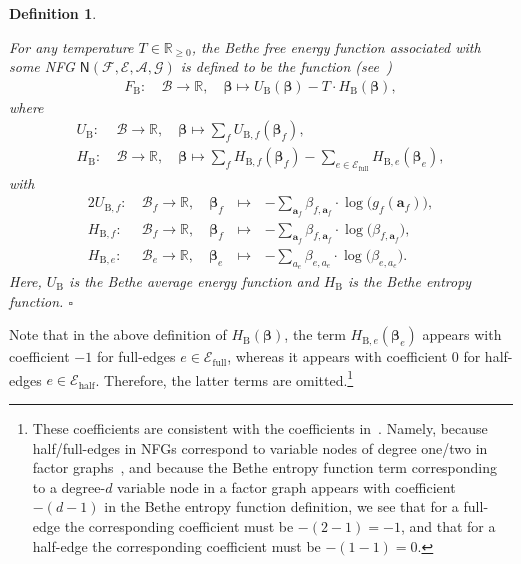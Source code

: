 \documentclass[journal, twocolumn]{IEEEtran}
\renewcommand{\mathbf}[1]{{\bm{#1}}}
\renewcommand{\geq}{\geqslant}
\newcommand{\R}{\mathbb{R}}
\newcommand{\Rp}{\mathbb{R}_{\geq 0}}
\newcommand{\vect}[1]{\mathbf{#1}}
\newcommand{\set}[1]{\mathcal{#1}}
\newcommand{\graph}[1]{\mathsf{#1}}
\newcommand{\bel}{\beta}
\newcommand{\vbel}{\boldsymbol{\bel}}
\newcommand{\setA}{\set{A}}
\newcommand{\setE}{\set{E}}
\newcommand{\setEfull}{\set{E}_{\mathrm{full}}}
\newcommand{\setEhalf}{\set{E}_{\mathrm{half}}}
\newcommand{\setF}{\set{F}}
\newcommand{\setG}{\set{G}}
\newcommand{\va}{\vect{a}}
\newcommand{\lmpB}{\mathcal{B}}
\newcommand{\graphN}{\graph{N}}
\newcommand{\FBethe}{F_{\mathrm{B}}}
\newcommand{\UBethe}{U_{\mathrm{B}}}
\newcommand{\HBethe}{H_{\mathrm{B}}}
\newcommand{\UBethesub}[1]{U_{\mathrm{B},#1}}
\newcommand{\HBethesub}[1]{H_{\mathrm{B},#1}}
\newcommand{\?}{\mathrm{?}}
\newcommand{\qedwhite}{\hspace*{\fill}%
  $\square$\smallskip}
\newcommand{\defend}{\qedwhite}
\newtheorem{Definition}[Lemma]{Definition}
\begin{document}
\begin{Definition}
  \label{def:Bethe:free:energy:1}

  For any temperature $T \in \Rp$, the Bethe free energy function associated
  with some NFG $\graphN(\setF,\setE, \setA, \setG)$ is
  defined to be the function (see~\cite{Yedidia:Freeman:Weiss:05:1})
  \begin{align*}
    \FBethe: \ 
      &\lmpB
         \to \R, \quad
       \vbel
       \mapsto
         \UBethe(\vbel)
         -
         T
         \cdot \HBethe(\vbel),
  \end{align*}
  where
  \begin{align*}
    \UBethe: \ 
      &\lmpB
         \to \R, 
       \quad
       \vbel
       \mapsto
         \sum_f
           \UBethesub{f}(\vbel_f), \\
    \HBethe: \ 
      &\lmpB
         \to \R,
       \quad
       \vbel
       \mapsto
         \sum_f
           \HBethesub{f}(\vbel_f)
         -
         \sum_{e \in \setEfull}
           \HBethesub{e}(\vbel_e),
  \end{align*}
  with
  \begin{alignat*}{2}
    \UBethesub{f}: \ 
      &\lmpB_f
         \to \R, \quad
       \vbel_f
       &
       \, \mapsto\,
       &
         -
         \sum_{\va_f}
           \bel_{f,\va_f}
           \cdot
           \log
             \big(
               g_f(\va_f)
             \big), \\
    \HBethesub{f}: \ 
      &\lmpB_f
         \to \R, \quad
       \vbel_f
       &
       \, \mapsto\,
       &
         -
         \sum_{\va_f}
           \bel_{f,\va_f}
           \cdot
           \log
             \big(
               \bel_{f,\va_f}
             \big), \\
    \HBethesub{e}: \ 
      &\lmpB_e
         \to \R, \quad
       \vbel_e
       &
       \, \mapsto\,
       &
         -
         \sum_{a_e}
           \bel_{e,a_e}
           \cdot
           \log
             \big(
               \bel_{e,a_e}
             \big).
  \end{alignat*}
  Here, $\UBethe$ is the Bethe average energy function and $\HBethe$ is the
  Bethe entropy function. 
  \defend
\end{Definition}



Note that in the above definition of $\HBethe(\vbel)$, the term
$\HBethesub{e}(\vbel_e)$ appears with coefficient $-1$ for full-edges $e \in
\setEfull$, whereas it appears with coefficient $0$ for half-edges $e \in
\setEhalf$. Therefore, the latter terms are omitted.\footnote{These
  coefficients are consistent with the coefficients
  in~\cite{Yedidia:Freeman:Weiss:05:1}. Namely, because half/full-edges in
  NFGs correspond to variable nodes of degree one/two in
  factor graphs~\cite{Loeliger:04:1}, and because the Bethe entropy function
  term corresponding to a degree-$d$ variable node in a factor graph appears
  with coefficient $-(d-1)$ in the Bethe entropy function definition, we see
  that for a full-edge the corresponding coefficient must be $-(2-1) = -1$,
  and that for a half-edge the corresponding coefficient must be $-(1-1) =
  0$.}
\end{document}
